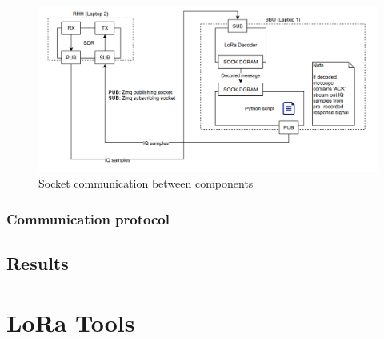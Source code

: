 \begin{figure}[h]
    \centering
    \includegraphics[width=1\textwidth]{figures/impl_diagram.png}
    \caption{Socket communication between components}
    \label{fig:impl_diagram}
\end{figure}
\subsection{Communication protocol}
\label{sec:comm_prot}

\section{Results}

\chapter{LoRa Tools}

